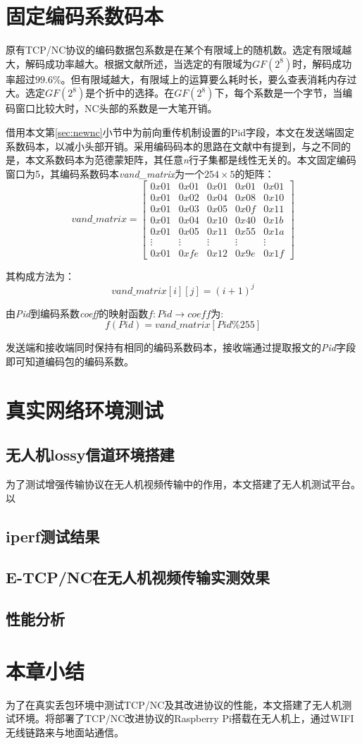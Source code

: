 \section{固定编码系数码本}
原有TCP/NC协议的编码数据包系数是在某个有限域上的随机数。选定有限域越大，解码成功率越大。根据文献\cite{4015738}所述，当选定的有限域为$GF\left(2^8\right)$时，解码成功率超过$99.6\%$。但有限域越大，有限域上的运算要么耗时长，要么查表消耗内存过大。选定$GF\left(2^8\right)$是个折中的选择。在$GF\left(2^8\right)$下，每个系数是一个字节，当编码窗口比较大时，NC头部的系数是一大笔开销。
\par
借用本文第\ref{sec:newnc}小节中为前向重传机制设置的Pid字段，本文在发送端固定系数码本，以减小头部开销。采用编码码本的思路在文献\cite{宋蒙2015基于网络编码的}中有提到，与之不同的是，本文系数码本为范德蒙矩阵，其任意\emph{n}行子集都是线性无关的。本文固定编码窗口为5，其编码系数码本\emph{vand\_matrix}为一个$254 \times 5$的矩阵：
\begin{equation}
	vand\_matrix=\left[ {\begin{array}{*{20}{c}}
		{0x01}&{0x01}&{0x01}&{0x01}&{0x01}\\
		{0x01}&{0x02}&{0x04}&{0x08}&{0x10}\\
		{0x01}&{0x03}&{0x05}&{0x0f}&{0x11}\\
		{0x01}&{0x04}&{0x10}&{0x40}&{0x1b}\\
		{0x01}&{0x05}&{0x11}&{0x55}&{0x1a}\\
		{\vdots}&{\vdots}&{\vdots}&{\vdots}&{\vdots}\\
		{0x01}&{0xfe}&{0x12}&{0x9e}&{0x1f}
		\end{array}} \right]
\end{equation}
\par
其构成方法为：
\begin{equation}
	vand\_matrix[i][j]=(i+1)^j
\end{equation}
\par
由\emph{Pid}到编码系数\emph{coeff}的映射函数$f:Pid \rightarrow coeff$为:
\begin{equation}
	f(Pid)=vand\_matrix[Pid\%255]
\end{equation}
\par
发送端和接收端同时保持有相同的编码系数码本，接收端通过提取报文的\emph{Pid}字段即可知道编码包的编码系数。
\section{真实网络环境测试}
\subsection{无人机lossy信道环境搭建}
为了测试增强传输协议在无人机视频传输中的作用，本文搭建了无人机测试平台。以
\subsection{iperf测试结果}
\subsection{E-TCP/NC在无人机视频传输实测效果}
\subsection{性能分析}
\section{本章小结}
为了在真实丢包环境中测试TCP/NC及其改进协议的性能，本文搭建了无人机测试环境。将部署了TCP/NC改进协议的Raspberry Pi搭载在无人机上，通过WIFI无线链路来与地面站通信。 